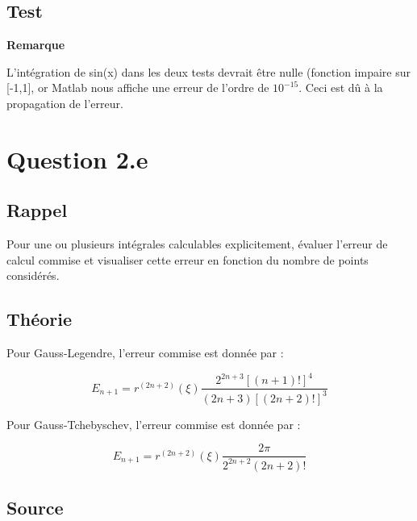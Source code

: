 \documentclass[a4paper,10pt]{report}
\begin{document}
\subsection*{Test}
\begin{center}




\end{center}

\textbf{Remarque}
 
L'intégration de sin(x) dans les deux tests devrait être nulle (fonction impaire sur [-1,1], or Matlab nous affiche une erreur de l'ordre de $10^{-15}$. Ceci est dû à la propagation de l'erreur.

\section*{Question 2.e}

\subsection*{Rappel}

Pour une ou plusieurs intégrales calculables explicitement, évaluer l’erreur de calcul commise et visualiser cette erreur en fonction du nombre de points considérés.

\subsection*{Théorie}

Pour Gauss-Legendre, l’erreur commise est donnée par :

\begin{equation*}
E_{n+1} = r^{(2n+2)}(\xi) \frac{2^{2n+3}\left[(n+1)!\right]^4}{(2n+3)\left[(2n+2)!\right]^3}
\end{equation*}

Pour Gauss-Tchebyschev, l’erreur commise est donnée par :

\begin{equation*}
E_{n+1} = r^{(2n+2)}(\xi) \frac{2\pi}{2^{2n+2}(2n+2)!}
\end{equation*}

\subsection*{Source}
\end{document}
